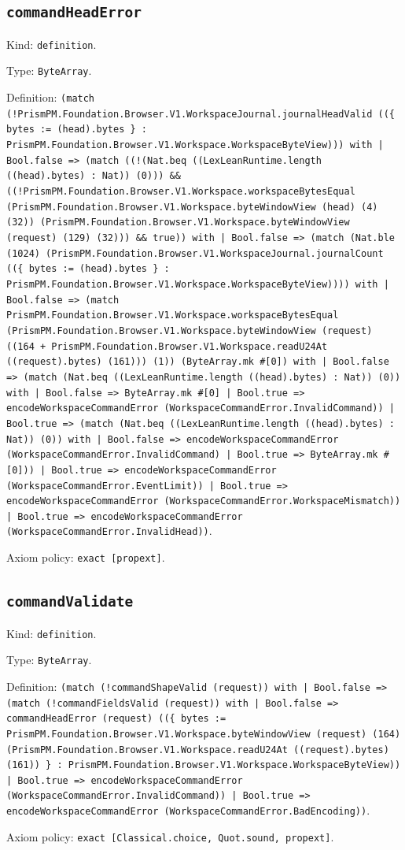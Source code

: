 \documentclass[11pt]{article}
\begin{document}
\subsection*{\texttt{commandHeadError}}
\noindent Kind: \texttt{definition}.\par
\noindent Type: \texttt{ByteArray}.\par
\noindent Definition: \texttt{(match (!PrismPM.Foundation.Browser.V1.WorkspaceJournal.journalHeadValid ((\{ bytes := (head).bytes \} : PrismPM.Foundation.Browser.V1.Workspace.WorkspaceByteView))) with | Bool.false => (match ((!(Nat.beq ((LexLeanRuntime.length ((head).bytes) : Nat)) (0))) \&\& ((!PrismPM.Foundation.Browser.V1.Workspace.workspaceBytesEqual (PrismPM.Foundation.Browser.V1.Workspace.byteWindowView (head) (4) (32)) (PrismPM.Foundation.Browser.V1.Workspace.byteWindowView (request) (129) (32))) \&\& true)) with | Bool.false => (match (Nat.ble (1024) (PrismPM.Foundation.Browser.V1.WorkspaceJournal.journalCount ((\{ bytes := (head).bytes \} : PrismPM.Foundation.Browser.V1.Workspace.WorkspaceByteView)))) with | Bool.false => (match PrismPM.Foundation.Browser.V1.Workspace.workspaceBytesEqual (PrismPM.Foundation.Browser.V1.Workspace.byteWindowView (request) ((164 + PrismPM.Foundation.Browser.V1.Workspace.readU24At ((request).bytes) (161))) (1)) (ByteArray.mk \#[0]) with | Bool.false => (match (Nat.beq ((LexLeanRuntime.length ((head).bytes) : Nat)) (0)) with | Bool.false => ByteArray.mk \#[0] | Bool.true => encodeWorkspaceCommandError (WorkspaceCommandError.InvalidCommand)) | Bool.true => (match (Nat.beq ((LexLeanRuntime.length ((head).bytes) : Nat)) (0)) with | Bool.false => encodeWorkspaceCommandError (WorkspaceCommandError.InvalidCommand) | Bool.true => ByteArray.mk \#[0])) | Bool.true => encodeWorkspaceCommandError (WorkspaceCommandError.EventLimit)) | Bool.true => encodeWorkspaceCommandError (WorkspaceCommandError.WorkspaceMismatch)) | Bool.true => encodeWorkspaceCommandError (WorkspaceCommandError.InvalidHead))}.\par
\noindent Axiom policy: \texttt{exact [propext]}.\par
\subsection*{\texttt{commandValidate}}
\noindent Kind: \texttt{definition}.\par
\noindent Type: \texttt{ByteArray}.\par
\noindent Definition: \texttt{(match (!commandShapeValid (request)) with | Bool.false => (match (!commandFieldsValid (request)) with | Bool.false => commandHeadError (request) ((\{ bytes := PrismPM.Foundation.Browser.V1.Workspace.byteWindowView (request) (164) (PrismPM.Foundation.Browser.V1.Workspace.readU24At ((request).bytes) (161)) \} : PrismPM.Foundation.Browser.V1.Workspace.WorkspaceByteView)) | Bool.true => encodeWorkspaceCommandError (WorkspaceCommandError.InvalidCommand)) | Bool.true => encodeWorkspaceCommandError (WorkspaceCommandError.BadEncoding))}.\par
\noindent Axiom policy: \texttt{exact [Classical.choice, Quot.sound, propext]}.\par
\end{document}
